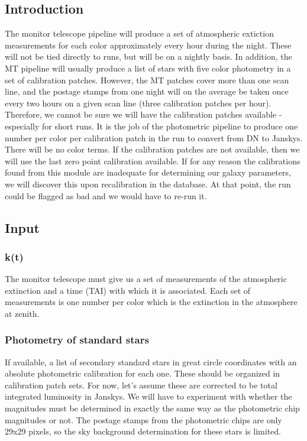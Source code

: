 
\subsection{Introduction}

The monitor telescope pipeline will produce a set of atmospheric extiction
measurements for each color approximately every hour during the night.  These
will not be tied directly to runs, but will be on a nightly basis.  In addition,
the MT pipeline will usually produce a list of stars with five color 
photometry in a set of calibration patches.  However, the MT patches cover
more than one scan line, and the postage stamps from one night will on
the average be taken once every two hours on a given scan line (three
calibration patches per hour).  Therefore, we cannot be sure we will have
the calibration patches available - especially for short runs.
It is the job of the photometric pipeline to
produce one number per color per calibration patch in the run to convert 
from DN to Janskys.  There will be no color terms.  If the calibration 
patches are not available, then we will use
the last zero point calibration available.  If for any reason the calibrations
found from this module are inadequate for determining our galaxy parameters,
we will discover this upon recalibration in the database.  At that point, the
run could be flagged as bad and we would have to re-run it.

\subsection{Input}

\subsubsection{k(t)}

The monitor telescope must give us a set of measurements of the atmospheric
extinction and a time (TAI) with which it is associated.  Each set of
measurements is one number per color which is the extinction in the
atmosphere at zenith.

\subsubsection{Photometry of standard stars}

If available, a list of secondary standard stars in great circle coordinates
with an absolute photometric calibration for each one.  These should be
organized in calibration patch sets.  For now, let's
assume these are corrected to be total integrated luminosity in Janskys.
We will have to experiment with whether the magnitudes must be determined
in exactly the same way as the photometric chip magnitudes or not.  The
postage stamps from the photometric chips are only 29x29 pixels, so the
sky background determination for these stars is limited.

